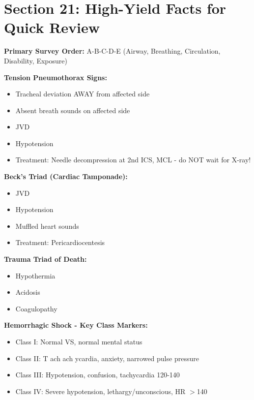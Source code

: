 \documentclass[11pt]{article}
\begin{document}
\newpage
\section*{Section 21: High-Yield Facts for Quick Review}

\begin{tcolorbox}[colback=yellow!10!white,colframe=yellow!75!black,title=MUST KNOW for Exam]

\textbf{Primary Survey Order:} A-B-C-D-E (Airway, Breathing, Circulation, Disability, Exposure)

\textbf{Tension Pneumothorax Signs:}
\begin{itemize}
    \item Tracheal deviation AWAY from affected side
    \item Absent breath sounds on affected side
    \item JVD
    \item Hypotension
    \item Treatment: Needle decompression at 2nd ICS, MCL - do NOT wait for X-ray!
\end{itemize}

\textbf{Beck's Triad (Cardiac Tamponade):}
\begin{itemize}
    \item JVD
    \item Hypotension
    \item Muffled heart sounds
    \item Treatment: Pericardiocentesis
\end{itemize}

\textbf{Trauma Triad of Death:}
\begin{itemize}
    \item Hypothermia
    \item Acidosis
    \item Coagulopathy
\end{itemize}

\textbf{Hemorrhagic Shock - Key Class Markers:}
\begin{itemize}
    \item Class I: Normal VS, normal mental status
    \item Class II: T
ach
ach
ycardia, anxiety, narrowed pulse pressure
    \item Class III: Hypotension, confusion, tachycardia 120-140
    \item Class IV: Severe hypotension, lethargy/unconscious, HR $>$140
\end{itemize}


\end{tcolorbox}
\end{document}
